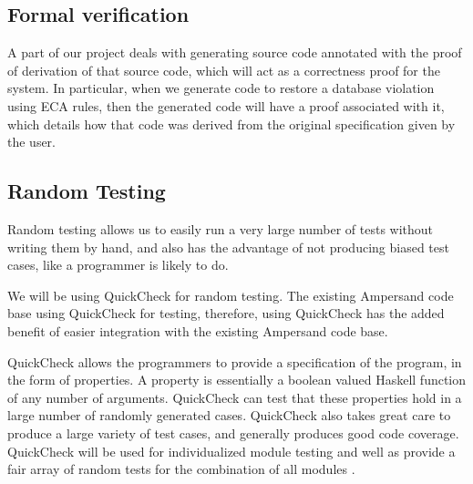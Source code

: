 \documentclass[12pt]{report}
\begin{document}
\subsection{Formal verification}\label{subsec:FormalVer}
A part of our project deals with generating source code annotated with the proof
of derivation of that source code, which will act as a correctness proof for the
system. In particular, when we generate code to restore a database violation
using ECA rules, then the generated code will have a proof associated with it,
which details how that code was derived from the original specification given by
the user.

\subsection{Random Testing}\label{subsec:RandTest}
Random testing allows us to easily run a very large number of tests without
writing them by hand, and also has the advantage of not producing biased test
cases, like a programmer is likely to do.

We will be using QuickCheck \cite{hackage} for random testing. The existing 
Ampersand code base
using QuickCheck for testing, therefore, using QuickCheck has the added benefit
of easier integration with the existing Ampersand code base.

QuickCheck allows the programmers to provide a specification of the program, in
the form of properties. A property is essentially a boolean valued Haskell
function of any number of arguments. QuickCheck can test that these properties
hold in a large number of randomly generated cases. QuickCheck also takes great
care to produce a large variety of test cases, and generally produces good code
coverage. QuickCheck will be used for individualized module testing and well as 
provide a fair array of random tests for the combination of all modules 
\cite{hackage}.


\end{document}
